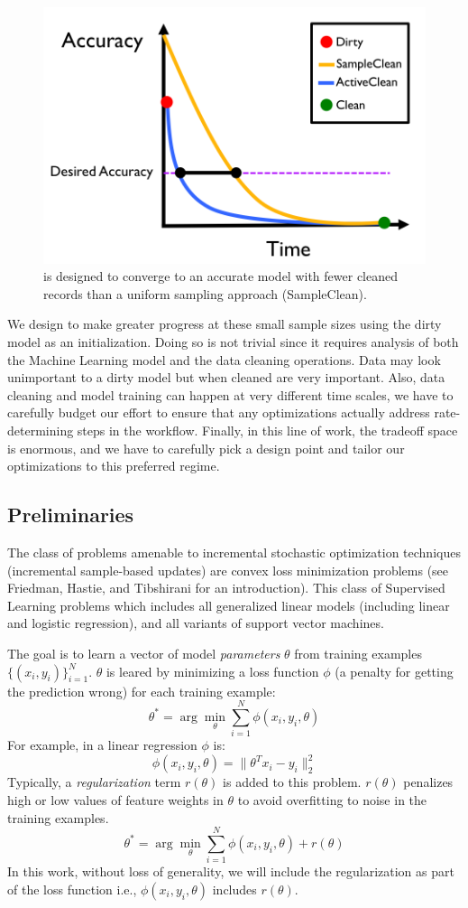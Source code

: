 \begin{figure}[t]
\centering
 \includegraphics[width=0.5\columnwidth]{figs/arch2.png}
 \caption{\sys is designed to converge to an accurate model with fewer cleaned records than a uniform sampling approach (SampleClean). \label{sys-arch2}}\vspace{-1em}
\end{figure}


We design \sys to make greater progress at these small sample sizes using the dirty model as an initialization.
Doing so is not trivial since it requires analysis of both the Machine Learning model and the data cleaning operations.
Data may look unimportant to a dirty model but when cleaned are very important.
Also, data cleaning and model training can happen at very different time scales, we have to carefully budget our effort to ensure that any optimizations actually address rate-determining steps in the workflow.
Finally, in this line of work, the tradeoff space is enormous, and we have to carefully pick a design point and tailor our optimizations to this preferred regime.
\fi

\subsection{Preliminaries}
The class of problems amenable to incremental stochastic optimization techniques (incremental sample-based updates) are convex loss minimization problems (see Friedman, Hastie, and Tibshirani \cite{friedman2001elements} for an introduction).
This class of Supervised Learning problems which includes all generalized linear models (including linear and logistic regression), and all variants of support vector machines.

The goal is to learn a vector of model \emph{parameters} $\theta$ from training examples $\{(x_{i},y_{i})\}_{i=1}^{N}$.
$\theta$ is leared by minimizing a loss function $\phi$ (a penalty for getting the prediction wrong) for each training example:
\[
 \theta^{*}=\arg\min_{\theta}\sum_{i=1}^{N}\phi(x_{i},y_{i},\theta)
\]
For example, in a linear regression $\phi$ is:
\[
\phi(x_{i},y_{i},\theta) = \|\theta^Tx_{i} - y_i \|_2^2
\]
Typically, a \emph{regularization} term $r(\theta)$ is added to this problem.
$r(\theta)$ penalizes high or low values of feature weights in $\theta$ to avoid overfitting to noise in the training examples.
\[
 \theta^{*}=\arg\min_{\theta}\sum_{i=1}^{N}\phi(x_{i},y_{i},\theta) + r(\theta)
\]
In this work, without loss of generality, we will include the regularization as part of the loss function i.e., $\phi(x_{i},y_{i},\theta)$ includes $r(\theta)$.

